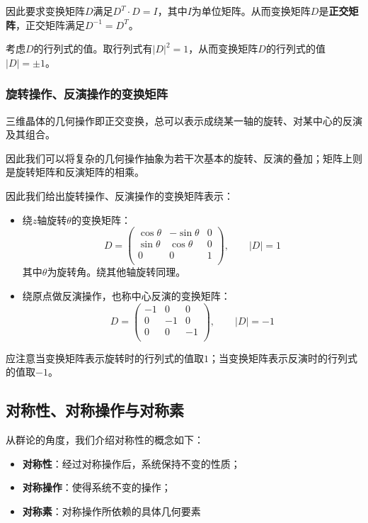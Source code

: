     因此要求变换矩阵$D$满足$D^T\cdot D = I$，其中$I$为单位矩阵。从而变换矩阵$D$是\textbf{正交矩阵}，正交矩阵满足$D^{-1}=D^T$。

    考虑$D$的行列式的值。取行列式有$\left\lvert D\right\rvert^2=1$，从而变换矩阵$D$的行列式的值$\left\lvert D\right\rvert= \pm 1$。

\subsubsection{旋转操作、反演操作的变换矩阵}
    三维晶体的几何操作即正交变换，总可以表示成绕某一轴的旋转、对某中心的反演及其组合。
    
    因此我们可以将复杂的几何操作抽象为若干次基本的旋转、反演的叠加；矩阵上则是旋转矩阵和反演矩阵的相乘。

    因此我们给出旋转操作、反演操作的变换矩阵表示：
    \begin{itemize}[itemsep=0pt,parsep=0pt]
        \item 
        绕$z$轴旋转$\theta$的变换矩阵：
        \[
        D=
        \left(
        \begin{array}{ccc}
            \cos\theta & -\sin\theta & 0 \\
            \sin\theta & \cos\theta  & 0 \\
            0          & 0           & 1 \\
        \end{array}
        \right)
        ,\qquad\left\lvert D\right\rvert= 1
        \]
        其中$\theta$为旋转角。绕其他轴旋转同理。
        \item 
        绕原点做反演操作，也称中心反演的变换矩阵：
        \[
        D=
        \left(
        \begin{array}{ccc}
            -1 & 0 & 0 \\
            0 & -1 & 0 \\
            0 & 0 & -1 \\
        \end{array}
        \right)
        ,\qquad\left\lvert D\right\rvert= -1
        \]
    \end{itemize}
    应注意当变换矩阵表示旋转时的行列式的值取$1$；当变换矩阵表示反演时的行列式的值取$-1$。

\subsection{对称性、对称操作与对称素}
    从群论的角度，我们介绍对称性的概念如下：
    \begin{itemize}[itemsep=0pt,parsep=0pt]
        \item \textbf{对称性}：经过对称操作后，系统保持不变的性质；
        \item \textbf{对称操作}：使得系统不变的操作；
        \item \textbf{对称素}：对称操作所依赖的具体几何要素
    \end{itemize}


